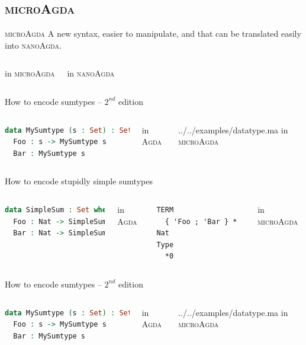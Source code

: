 \documentclass[xcolor=svgnames,11pt]{beamer}
\newcommand{\agda}{\textsc{Agda}\xspace}
\newcommand{\ma}{\textsc{microAgda}\xspace}
\newcommand{\na}{\textsc{nanoAgda}\xspace}
\begin{document}
\subsection{\ma}
\begin{frame}[fragile]{\ma}
A new syntax, easier to manipulate, and that can be translated easily into \na.

\begin{columns}

\centering in \ma
{}

\centering in \na
\end{columns}

\end{frame}


\begin{frame}[fragile]{How to encode sumtypes -- $2^{nd}$ edition}
\begin{columns}
\begin{lstlisting}[language=Agda]
data MySumtype (s : Set) : Set where
  Foo : s -> MySumtype s
  Bar : MySumtype s
\end{lstlisting}
\centering in \agda
{}

{../../examples/datatype.ma}
\centering in \ma
\end{columns}
\end{frame}

\begin{frame}[fragile]{How to encode stupidly simple sumtypes}
\begin{columns}
\begin{lstlisting}[language=Agda]
data SimpleSum : Set where
  Foo : Nat -> SimpleSum
  Bar : Nat -> SimpleSum
\end{lstlisting}
\centering in \agda
{}
\begin{lstlisting}[language=nanoAgda]
TERM
  { 'Foo ; 'Bar } * Nat
Type
  *0
\end{lstlisting}
\centering in \ma
\end{columns}
\end{frame}

\begin{frame}[fragile]{How to encode sumtypes -- $2^{nd}$ edition}
\begin{columns}
\begin{lstlisting}[language=Agda]
data MySumtype (s : Set) : Set where
  Foo : s -> MySumtype s
  Bar : MySumtype s
\end{lstlisting}
\centering in \agda
{}

{../../examples/datatype.ma}
\centering in \ma
\end{columns}
\end{frame}
\end{document}
